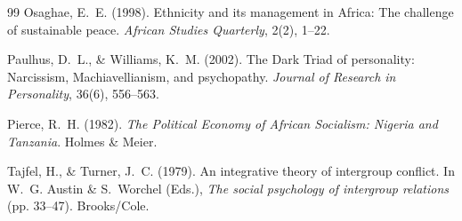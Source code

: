 \documentclass[11pt,a4paper]{article}
\begin{document}
\begin{thebibliography}{99}
Osaghae, E.~E. (1998).
\newblock Ethnicity and its management in {Africa}: The challenge of
  sustainable peace.
\newblock \emph{African Studies Quarterly}, 2(2), 1--22.

Paulhus, D.~L., \& Williams, K.~M. (2002).
\newblock The {Dark Triad} of personality: Narcissism, {Machiavellianism}, and
  psychopathy.
\newblock \emph{Journal of Research in Personality}, 36(6), 556--563.

Pierce, R.~H. (1982).
\newblock \emph{The Political Economy of African Socialism: Nigeria and
  Tanzania}.
\newblock Holmes \& Meier.

Tajfel, H., \& Turner, J.~C. (1979).
\newblock An integrative theory of intergroup conflict.
\newblock In W.~G. Austin \& S.~Worchel (Eds.), \emph{The social psychology of
  intergroup relations} (pp. 33--47). Brooks/Cole.

\end{thebibliography}
\end{document}

